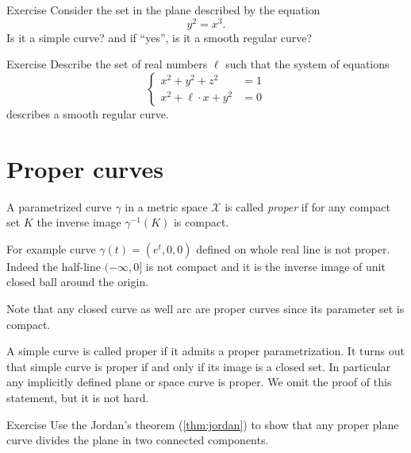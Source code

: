 \begin{thm}{Exercise}
Consider the set in the plane described by the equation
\[y^2=x^3.\]
Is it a simple curve? and if ``yes'', is it a smooth regular curve?
\end{thm}

\begin{thm}{Exercise}\label{ex:viviani}
Describe the set of real numbers $\ell$
such that the system of equations
\[\begin{cases}
x^2+y^2+z^2&=1
\\
x^2+\ell\cdot x+y^2&=0
\end{cases}\]
describes a smooth regular curve.
\end{thm}

\section*{Proper curves}

A parametrized curve $\gamma$ in a metric space $\mathcal{X}$ is called \emph{proper} if for any compact set $K$ the inverse image $\gamma^{-1}(K)$ is compact.

For example curve $\gamma(t)=(e^t,0,0)$ defined on whole real line is not proper.
Indeed the half-line $(-\infty,0]$ is not compact and it is the inverse image of unit closed ball around the origin.  

Note that any closed curve as well arc are proper curves since its parameter set is compact.

A simple curve is called proper if it admits a proper parametrization.
It turns out that simple curve is proper if and only if its image is a closed set.
In particular any implicitly defined plane or space curve is proper.
We omit the proof of this statement, but it is not hard. %

\begin{thm}{Exercise}\label{ex:proper-curve}
Use the Jordan's theorem (\ref{thm:jordan}) to show that any proper plane curve divides the plane in two connected components.  
\end{thm}



